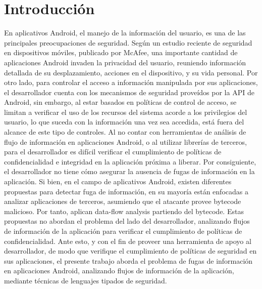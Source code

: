 \label{ch:introduccion}
\chapter{Introducción}
% 
% 

En aplicativos Android, el manejo de la información del usuario, es una de las
principales preocupaciones de seguridad. Según un estudio reciente de seguridad
en dispositivos móviles, publicado por McAfee\cite{McAfeeReport}, una importante
cantidad de aplicaciones Android invaden la privacidad del usuario, reuniendo
información detallada de su desplazamiento, acciones en el dispositivo, y su
vida personal.\newline
Por otro lado, para controlar el acceso a información manipulada por sus
aplicaciones, el desarrollador cuenta con los mecanismos de seguridad proveídos
por la API de Android, sin embargo, al estar basados en políticas de control de
acceso, se limitan a verificar el uso de los recursos del sistema acorde a los
privilegios del usuario, lo que suceda con la información una vez sea accedida,
está fuera del alcance de este tipo de controles. Al no contar con herramientas
de análisis de flujo de información en aplicaciones Android, o al utilizar
librerías de terceros, para el desarrollador es difícil verificar
el cumplimiento de políticas de confidencialidad e integridad en la aplicación
próxima a liberar. Por consiguiente, el desarrollador no tiene cómo asegurar la
ausencia de fugas de información en la aplicación.\newline 
Si bien, en el campo de aplicativos Android, existen diferentes propuestas para
detectar fuga de información, en su mayoría están enfocadas a analizar
aplicaciones de terceros, asumiendo que el atacante provee bytecode malicioso.
Por tanto, aplican data-flow analysis partiendo del bytecode. Estas propuestas
no abordan el problema del lado del desarrollador, analizando flujos de
información de la aplicación para verificar el cumplimiento de políticas de
confidencialidad.\newline
Ante esto, y con el fin de proveer una herramienta de apoyo al desarrollador, de
modo que verifique el cumplimiento de políticas de seguridad en sus
aplicaciones, el presente trabajo aborda el problema de fugas de información en
aplicaciones Android, analizando flujos de información de la aplicación,
mediante técnicas de lenguajes tipados de seguridad.

